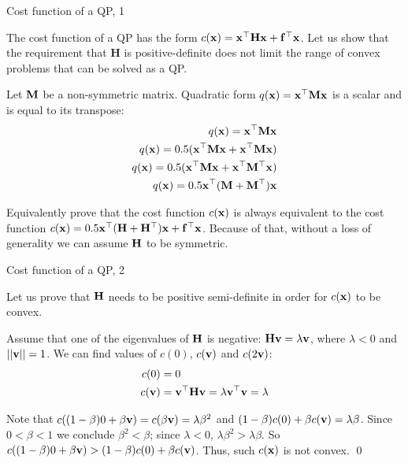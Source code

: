 \documentclass{beamer}
\begin{document}
\begin{frame}{Cost function of a QP, 1}
	\begin{flushleft}
		
		The cost function of a QP has the form $c(\mathbf{x}) = \mathbf{x}^\top \mathbf{H} \mathbf{x} + \mathbf{f}^\top\mathbf{x}$. Let us show that the requirement that $\mathbf{H}$ is positive-definite does not limit the range of convex problems that can be solved as a QP.
		
		\bigskip
		
		Let $\mathbf{M}$ be a non-symmetric matrix. Quadratic form $q(\mathbf{x}) = \mathbf{x}^\top \mathbf{M} \mathbf{x}$ is a scalar and is equal to its transpose:
		\begin{align}
			q(\mathbf{x}) = \mathbf{x}^\top \mathbf{M} \mathbf{x} \\
			q(\mathbf{x}) = 0.5 (\mathbf{x}^\top \mathbf{M} \mathbf{x} + \mathbf{x}^\top \mathbf{M} \mathbf{x}) \\
			q(\mathbf{x}) = 0.5 (\mathbf{x}^\top \mathbf{M} \mathbf{x} + \mathbf{x}^\top \mathbf{M}^\top \mathbf{x}) \\
			q(\mathbf{x}) = 0.5 \mathbf{x}^\top( \mathbf{M} + \mathbf{M}^\top )\mathbf{x}
		\end{align}
	
		Equivalently prove that the cost function $c(\mathbf{x})$ is always equivalent to the cost function $c(\mathbf{x}) = 0.5 \mathbf{x}^\top (\mathbf{H} + \mathbf{H}^\top) \mathbf{x} + \mathbf{f}^\top\mathbf{x}$. Because of that, without a loss of generality we can assume $\mathbf{H}$ to be symmetric.
		
	\end{flushleft}
\end{frame}


\begin{frame}{Cost function of a QP, 2}
	\begin{flushleft}
		
		Let us prove that $\mathbf{H}$ needs to be positive semi-definite in order for $c(\mathbf{x})$ to be convex.
		
		\bigskip
		
		Assume that one of the eigenvalues of $\mathbf{H}$ is negative: $\mathbf{H}\mathbf{v} = \lambda\mathbf{v}$, where $\lambda < 0$ and $||\mathbf{v}|| = 1$. We can find values of $c(0)$, $c(\mathbf{v})$ and $c(2\mathbf{v})$:
		\begin{align}
			c(0) &= 0 \\
			c(\mathbf{v}) &= \mathbf{v}^\top \mathbf{H}\mathbf{v} =  \lambda \mathbf{v}^\top \mathbf{v} =  \lambda
		\end{align}
		
		Note that $c((1 - \beta) 0 + \beta \mathbf{v}) = c(\beta\mathbf{v}) =  \lambda \beta^2$ and $(1 - \beta) c(0) + \beta c(\mathbf{v}) = \lambda \beta$. Since $0 < \beta < 1$ we conclude $\beta^2 < \beta$; since $\lambda < 0$, $\lambda \beta^2 > \lambda \beta$. So $c((1 - \beta) 0 + \beta \mathbf{v}) >  (1 - \beta) c(0) + \beta c(\mathbf{v})$. Thus, such $c(\mathbf{x})$ is not convex. \qed
		
	\end{flushleft}
\end{frame}
\end{document}

